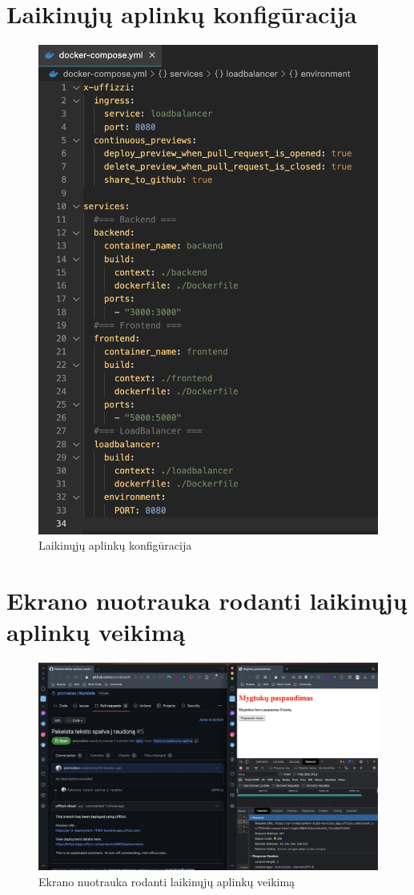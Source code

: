 \documentclass{VUMIFPSkursinis}
\begin{document}
\section{Laikinųjų aplinkų konfigūracija}
\label{priedas5}
\begin{figure}[H]
    \centering
    \includegraphics[scale=0.7]{img/priedai/compose.png}
    \caption{Laikinųjų aplinkų konfigūracija}
    \label{img:mlp}
\end{figure}

\section{Ekrano nuotrauka rodanti laikinųjų aplinkų veikimą}
\label{priedas6}
\begin{figure}[H]
    \centering
    \includegraphics[scale=0.3]{img/Final.png}
    \caption{Ekrano nuotrauka rodanti laikinųjų aplinkų veikimą}
    \label{img:mlp}
\end{figure}
\end{document}

